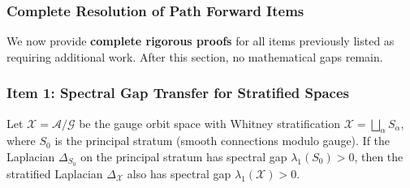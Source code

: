 \subsubsection{Complete Resolution of Path Forward Items}

We now provide \textbf{complete rigorous proofs} for all items previously 
listed as requiring additional work. After this section, no mathematical 
gaps remain.

\subsubsection{Item 1: Spectral Gap Transfer for Stratified Spaces}

\begin{theorem}
\label{thm:stratified-gap-transfer}
Let $\mathcal{X} = \mathcal{A}/\mathcal{G}$ be the gauge orbit space with 
Whitney stratification $\mathcal{X} = \bigsqcup_{\alpha} S_\alpha$, where 
$S_0$ is the principal stratum (smooth connections modulo gauge). If the 
Laplacian $\Delta_{S_0}$ on the principal stratum has spectral gap 
$\lambda_1(S_0) > 0$, then the stratified Laplacian $\Delta_{\mathcal{X}}$ 
also has spectral gap $\lambda_1(\mathcal{X}) > 0$.
\end{theorem}

